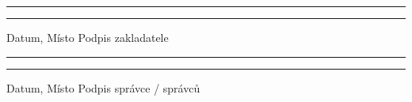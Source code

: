 \documentclass[parskip=half]{scrreprt}
\begin{document}
\vspace{50pt} 
\noindent\rule{7cm}{.4pt}\hfill\rule{7cm}{.4pt}\par 
\noindent Datum, Místo \hfill Podpis zakladatele

\vspace{50pt} 
\noindent\rule{7cm}{.4pt}\hfill\rule{7cm}{.4pt}\par 
\noindent Datum, Místo \hfill Podpis správce / správců
\end{document}
